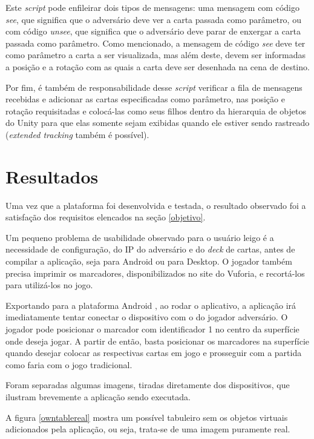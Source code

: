\documentclass[conference]{IEEEtran}
\begin{document}
Este \textit{script} pode enfileirar dois tipos de mensagens: uma mensagem com 
código \textit{see}, que significa que o adversário deve ver a carta passada 
como parâmetro, ou com código \textit{unsee}, que significa que o adversário 
deve parar de enxergar a carta passada como parâmetro. Como mencionado, 
a mensagem de código \textit{see} deve ter como parâmetro a carta a ser 
visualizada, mas além deste, devem ser informadas a posição e a rotação com as 
quais a carta deve ser desenhada na cena de destino.

Por fim, é também de responsabilidade desse \textit{script} verificar a fila de 
mensagens recebidas e adicionar as cartas especificadas como parâmetro, nas 
posição e rotação requisitadas e colocá-las como seus filhos dentro da 
hierarquia de objetos do Unity para que elas somente sejam exibidas quando ele 
estiver sendo rastreado (\textit{extended tracking} também é possível).

\section{Resultados}
\label{resultados}
Uma vez que a plataforma foi desenvolvida e testada, o resultado observado foi 
a satisfação dos requisitos elencados na seção \ref{objetivo}.

Um pequeno problema de usabilidade observado para o usuário leigo é a 
necessidade de configuração, do IP do adversário e do \textit{deck} de cartas, 
antes de compilar a aplicação, seja para Android \cite{android} ou para Desktop. 
O jogador também precisa imprimir os marcadores, disponibilizados no site do 
Vuforia, e recortá-los para utilizá-los no jogo.

Exportando para a plataforma Android \cite{android}, ao rodar o aplicativo, a 
aplicação irá imediatamente tentar conectar o dispositivo com o do jogador 
adversário. O jogador pode posicionar o marcador com identificador 1 no centro 
da superfície onde deseja jogar. A partir de então, basta posicionar os 
marcadores na superfície quando desejar colocar as respectivas cartas em jogo e 
prosseguir com a partida como faria com o jogo tradicional.

Foram separadas algumas imagens, tiradas diretamente dos dispositivos, que 
ilustram brevemente a aplicação sendo executada.

A figura \ref{owntablereal} mostra um possível tabuleiro sem os objetos virtuais 
adicionados pela aplicação, ou seja, trata-se de uma imagem puramente real.
\end{document}
